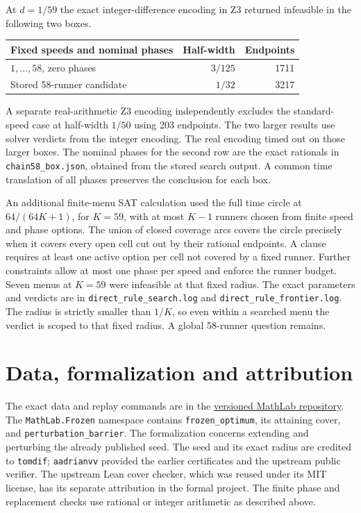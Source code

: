 \documentclass[11pt]{article}
\begin{document}
At \(d=1/59\) the exact integer-difference encoding in Z3 returned
infeasible in the following two boxes.
\begin{center}
\begin{tabular}{@{}lrr@{}}
\toprule
Fixed speeds and nominal phases & Half-width & Endpoints \\
\midrule
\(1,\ldots,58\), zero phases & \(3/125\) & 1711 \\
Stored 58-runner candidate & \(1/32\) & 3217 \\
\bottomrule
\end{tabular}
\end{center}
A separate real-arithmetic Z3 encoding independently excludes the
standard-speed case at half-width \(1/50\) using 203 endpoints.
The two larger results use solver verdicts from the integer encoding.
The real encoding timed out on those larger boxes.
The nominal phases for the second row are the exact rationals in
\texttt{chain58\_box.json}, obtained from the stored search output.
A common time translation of all phases preserves the conclusion for
each box.

An additional finite-menu SAT calculation used the full time circle
at \(64/(64K+1)\), for \(K=59\), with at most \(K-1\) runners
chosen from finite speed and phase options. The union of closed
coverage arcs covers the circle precisely when it covers every open
cell cut out by their rational endpoints. A clause requires at least
one active option per cell not covered by a fixed runner. Further
constraints allow at most one phase per speed and enforce the
runner budget. Seven menus at \(K=59\) were infeasible at that fixed
radius. The exact parameters and verdicts are in
\texttt{direct\_rule\_search.log} and
\texttt{direct\_rule\_frontier.log}. The radius is strictly smaller
than \(1/K\), so even within a searched menu the verdict is scoped to
that fixed radius. A global 58-runner question remains.

\section*{Data, formalization and attribution}

The exact data and replay commands are in the
\href{https://github.com/F1Justin/MathLab/tree/v1.0.0}{versioned MathLab repository}.
The \texttt{MathLab.Frozen} namespace contains
\texttt{frozen\_optimum}, its attaining cover, and
\texttt{perturbation\_barrier}. The formalization
concerns extending and perturbing the already published seed.
The seed and its exact radius are credited to \texttt{tomdif};
\texttt{aadrianvv} provided the earlier certificates and
the upstream public verifier. The upstream Lean cover checker,
which was reused under its MIT license, has its separate attribution
in the formal project. The finite phase and replacement checks
use rational or integer arithmetic as described above.
\end{document}

